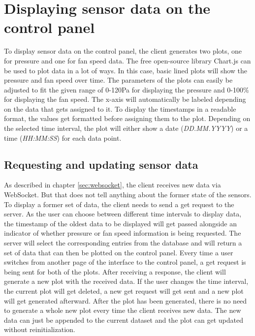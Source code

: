 \section{Displaying sensor data on the control panel}
\label{sec:display_control_panel}
To display sensor data on the control panel, the client generates two plots, one for pressure and one for fan speed data. The free open-source library Chart.js can be used to plot data in a lot of ways. In this case, basic lined plots will show the pressure and fan speed over time.  The parameters of the plots can easily be adjusted to fit the given range of 0-120Pa for displaying the pressure and 0-100\% for displaying the fan speed. The x-axis will automatically be labeled depending on the data that gets assigned to it. To display the timestamps in a readable format, the values get formatted before assigning them to the plot. Depending on the selected time interval, the plot will either show a date (\textit{DD.MM.YYYY}) or a time (\textit{HH:MM:SS}) for each data point.



\subsection{Requesting and updating sensor data}
\label{subsec:request_sensor_data}
As described in chapter \ref{sec:websocket}, the client receives new data via WebSocket. But that does not tell anything about the former state of the sensors. To display a former set of data, the client needs to send a get request to the server.  As the user can choose between different time intervals to display data, the timestamp of the oldest data to be displayed will get passed alongside an indicator of whether pressure or fan speed information is being requested.  The server will select the corresponding entries from the database and will return a set of data that can then be plotted on the control panel. Every time a user switches from another page of the interface to the control panel, a get request is being sent for both of the plots. After receiving a response, the client will generate a new plot with the received data. If the user changes the time interval, the current plot will get deleted, a new get request will get sent and a new plot will get generated afterward.
After the plot has been generated, there is no need to generate a whole new plot every time the client receives new data. The new data can just be appended to the current dataset and the plot can get updated without reinitialization.



